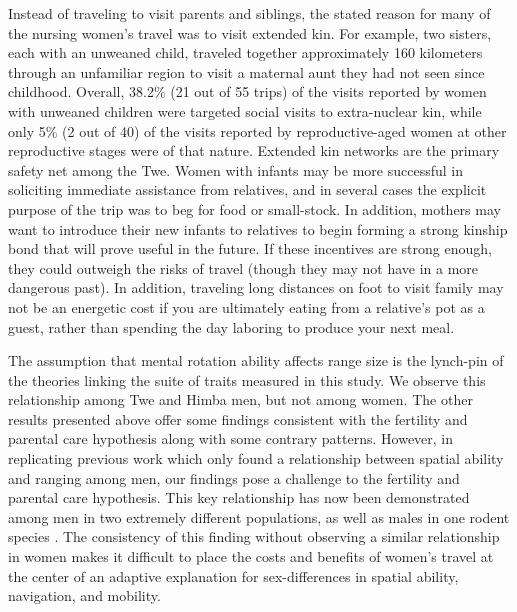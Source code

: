 Instead of traveling to visit parents and siblings, the stated reason for many of the nursing women's travel was to visit extended kin.  For example, two sisters, each with an unweaned child, traveled together approximately 160 kilometers through an unfamiliar region to visit a maternal aunt they had not seen since childhood.  Overall, 38.2\% (21 out of 55 trips) of the visits reported by women with unweaned children were targeted social visits to extra-nuclear kin, while only 5\% (2 out of 40) of the visits reported by reproductive-aged women at other reproductive stages were of that nature.  Extended kin networks are the primary safety net among the Twe.  Women with infants may be more successful in soliciting immediate assistance from relatives, and in several cases the explicit purpose of the trip was to beg for food or small-stock.  In addition, mothers may want to introduce their new infants to relatives to begin forming a strong kinship bond that will prove useful in the future.  If these incentives are strong enough, they could outweigh the risks of travel (though they may not have in a more dangerous past).  In addition, traveling long distances on foot to visit family may not be an energetic cost if you are ultimately eating from a relative's pot as a guest, rather than spending the day laboring to produce your next meal.

The assumption that mental rotation ability affects range size is the lynch-pin of the theories linking the suite of traits measured in this study.  We observe this relationship among Twe and Himba men, but not among women.  The other results presented above offer some findings consistent with the fertility and parental care hypothesis along with some contrary patterns.  However, in replicating previous work which only found a relationship between spatial ability and ranging among men, our findings pose a challenge to the fertility and parental care hypothesis.  This key relationship has now been demonstrated among men in two extremely different populations, as well as males in one rodent species \citep{spritzer2005influence}.  The consistency of this finding without observing a similar relationship in women makes it difficult to place the costs and benefits of women's travel at the center of an adaptive explanation for sex-differences in spatial ability, navigation, and mobility. 






